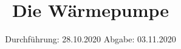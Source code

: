 

\subject{D 206}
\title{Die Wärmepumpe}
\date{
  Durchführung: 28.10.2020
  \hspace{3em}
  Abgabe: 03.11.2020
}



\maketitle
\thispagestyle{empty}
\tableofcontents
\newpage






\printbibliography{}



